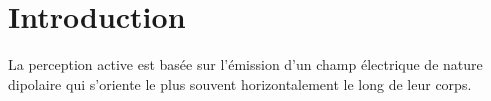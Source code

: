 \section{Introduction}

La perception active est basée sur l'émission d'un champ électrique de nature dipolaire qui s'oriente le plus souvent horizontalement le long de leur corps. \cite{BENACHENHOU2014}